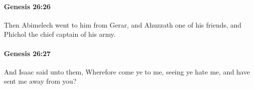 		\paragraph{Genesis 26:26} %
			\label{GENESIS-26-26}

			Then Abimelech went to him from Gerar, and Ahuzzath one of his friends, and Phichol the chief captain of his army.


		\paragraph{Genesis 26:27} %
			\label{GENESIS-26-27}

			And Isaac said unto them, Wherefore come ye to me, seeing ye hate me, and have sent me away from you?


